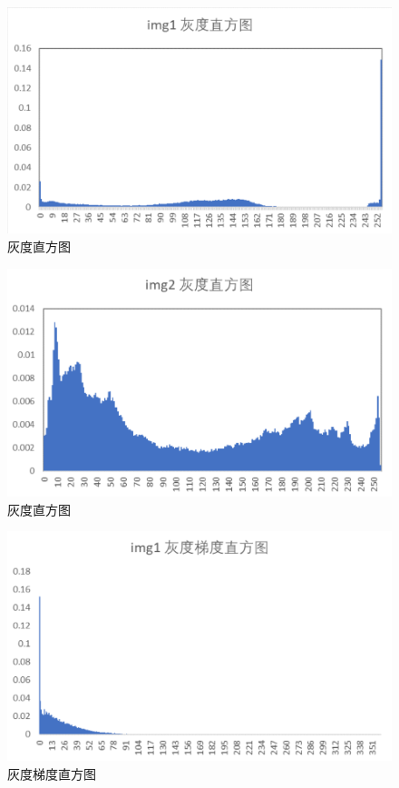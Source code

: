 \documentclass{article}
\begin{document}
\begin{figure}[htb]
\centering
\includegraphics[width=13.5cm]{img/2-1.png}
\caption{灰度直方图}
\label{2}
\end{figure}
\begin{figure}[htb]
\centering
\includegraphics[width=13.5cm]{img/2-2.png}
\caption{灰度直方图}
\label{2.2}
\end{figure}

\begin{figure}[htb]
\centering
\includegraphics[width=13.5cm]{img/3-1.png}
\caption{灰度梯度直方图}
\label{3}
\end{figure}
\end{document}
